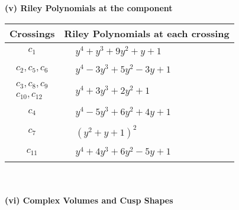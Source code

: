 \documentclass[1p]{elsarticle_modified}
\theoremstyle{definition}
\begin{document}
\newpage\renewcommand{\arraystretch}{1}
\flushleft \textbf{(v) Riley Polynomials at the component}\newline \\
\begin{tabular}{m{50pt}|m{274pt}}
Crossings & \hspace{64pt}Riley Polynomials at each crossing \\
\hline $$\begin{aligned}c_{1}\end{aligned}$$&$\begin{aligned}
&y^4+y^3+9 y^2+y+1
\end{aligned}$\\
\hline $$\begin{aligned}c_{2},c_{5},c_{6}\end{aligned}$$&$\begin{aligned}
&y^4-3 y^3+5 y^2-3 y+1
\end{aligned}$\\
\hline $$\begin{aligned}c_{3},c_{8},c_{9}\\c_{10},c_{12}\end{aligned}$$&$\begin{aligned}
&y^4+3 y^3+2 y^2+1
\end{aligned}$\\
\hline $$\begin{aligned}c_{4}\end{aligned}$$&$\begin{aligned}
&y^4-5 y^3+6 y^2+4 y+1
\end{aligned}$\\
\hline $$\begin{aligned}c_{7}\end{aligned}$$&$\begin{aligned}
&(y^2+y+1)^2
\end{aligned}$\\
\hline $$\begin{aligned}c_{11}\end{aligned}$$&$\begin{aligned}
&y^4+4 y^3+6 y^2-5 y+1
\end{aligned}$\\
\hline
\end{tabular}\\~\\
\newpage\flushleft \textbf{(vi) Complex Volumes and Cusp Shapes}
\end{document}

